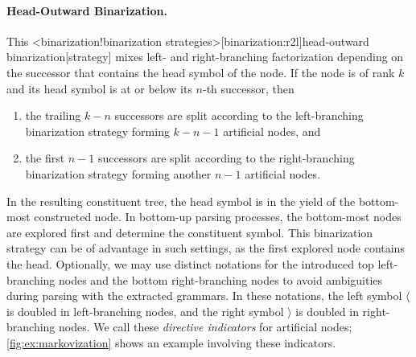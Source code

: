 \documentclass[../../document.tex]{subfiles}
\begin{document}
    \paragraph{Head-Outward Binarization.}
    This <binarization!binarization strategies>[binarization:r2l]{head-outward binarization}[strategy] mixes left- and right-branching factorization depending on the successor that contains the head symbol of the node.
    If the node is of rank \(k\) and its head symbol is at or below its \(n\)-th successor, then
    \begin{enumerate}
        \item the trailing \(k-n\) successors are split according to the left-branching binarization strategy forming \(k-n-1\) artificial nodes, and
        \item the first \(n-1\) successors are split according to the right-branching binarization strategy forming another \(n-1\) artificial nodes.
    \end{enumerate}
    In the resulting constituent tree, the head symbol is in the yield of the bottom-most constructed node.
    In bottom-up parsing processes, the bottom-most nodes are explored first and determine the constituent symbol.
    This binarization strategy can be of advantage in such settings, as the first explored node contains the head.
    Optionally, we may use distinct notations for the introduced top left-branching nodes and the bottom right-branching nodes to avoid ambiguities during parsing with the extracted grammars.
    In these notations, the left symbol \(\langle\) is doubled in left-branching nodes, and the right symbol \(\rangle\) is doubled in right-branching nodes.
    We call these \emph{directive indicators} for artificial nodes; \cref{fig:ex:markovization} shows an example involving these indicators.
\end{document}

